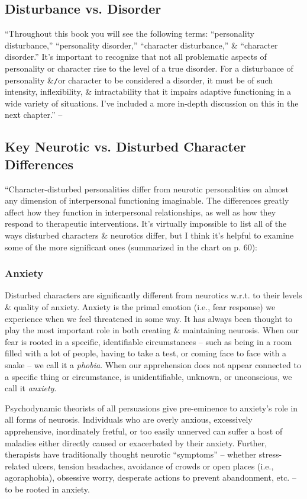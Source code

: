 \documentclass{article}
\numberwithin{equation}{section}
\begin{document}
\subsection{Disturbance vs. Disorder}
``Throughout this book you will see the following terms: ``personality disturbance,'' ``personality disorder,'' ``character disturbance,'' \& ``character disorder.'' It's important to recognize that not all problematic aspects of personality or character rise to the level of a true disorder. For a disturbance of personality \&\texttt{/}or character to be considered a disorder, it must be of such intensity, inflexibility, \& intractability that it impairs adaptive functioning in a wide variety of situations. I've included a more in-depth discussion on this in the next chapter.'' -- \cite[p. 27]{Simon2011}

\subsection{Key Neurotic vs. Disturbed Character Differences}
``Character-disturbed personalities differ from neurotic personalities on almost any dimension of interpersonal functioning imaginable. The differences greatly affect how they function in interpersonal relationships, as well as how they respond to therapeutic interventions. It's virtually impossible to list all of the ways disturbed characters \& neurotics differ, but I think it's helpful to examine some of the more significant ones (summarized in the chart on p. 60):

\subsubsection{Anxiety}
Disturbed characters are significantly different from neurotics w.r.t. to their levels \& quality of anxiety. Anxiety is the primal emotion (i.e., fear response) we experience when we feel threatened in some way. It has always been thought to play the most important role in both creating \& maintaining neurosis. When our fear is rooted in a specific, identifiable circumstances -- such as being in a room filled with a lot of people, having to take a test, or coming face to face with a snake -- we call it a \textit{phobia}. When our apprehension does not appear connected to a specific thing or circumstance, is unidentifiable, unknown, or unconscious, we call it \textit{anxiety}.
	
Psychodynamic theorists of all persuasions give pre-eminence to anxiety's role in all forms of neurosis. Individuals who are overly anxious, excessively apprehensive, inordinately fretful, or too easily unnerved can suffer a host of maladies either directly caused or exacerbated by their anxiety. Further, therapists have traditionally thought neurotic ``symptoms'' -- whether stress-related ulcers, tension headaches, avoidance of crowds or open places (i.e., agoraphobia), obsessive worry, desperate actions to prevent abandonment, etc. -- to be rooted in anxiety.
\end{document}

